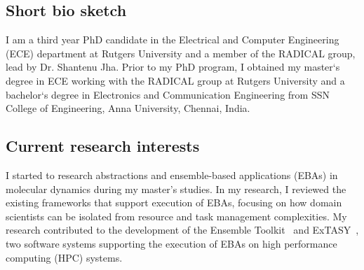 \subsection{Short bio sketch}
I am a third year PhD candidate in the Electrical and Computer Engineering (ECE)
department at Rutgers University and a member of the RADICAL group, lead by 
Dr. Shantenu Jha. Prior to my PhD program, I obtained my master`s degree in ECE 
working with the RADICAL group at Rutgers University and a bachelor`s degree in 
Electronics and Communication Engineering from SSN College of Engineering, Anna 
University, Chennai, India.


\subsection{Current research interests} I started to research abstractions
and ensemble-based applications (EBAs) in molecular dynamics during my
master's studies. In my research, I reviewed the existing frameworks that
support execution of EBAs, focusing on how domain scientists can be isolated
from resource and task management complexities. My research contributed to
the development of the Ensemble Toolkit~\cite{entk} and ExTASY~\cite{extasy},
two software systems supporting the execution of EBAs on high performance
computing (HPC) systems.

